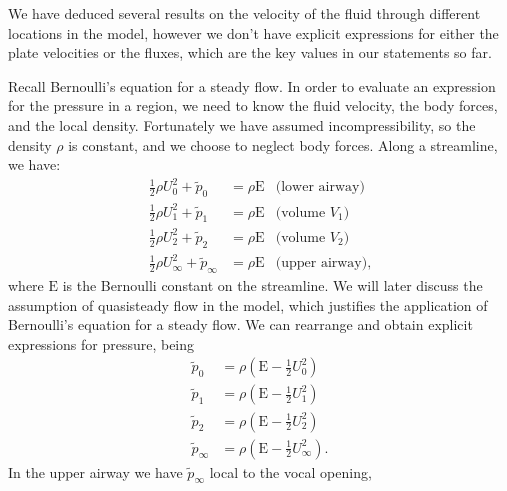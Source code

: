 \documentclass{report}
\begin{document}

We have deduced several results on the velocity of the fluid through different locations in the model,
however we don't have explicit expressions for either the plate velocities or the fluxes,
which are the key values in our statements so far.

Recall Bernoulli's equation for a steady flow.
In order to evaluate an expression for the pressure in a region,
we need to know the fluid velocity, the body forces, and the local density.
Fortunately we have assumed incompressibility, so the density $\rho$ is constant,
and we choose to neglect body forces.
Along a streamline, we have:
\begin{equation}
    \begin{aligned}
        \frac{1}{2}\rho U_0^2 + \tilde{p}_0 &= \rho\mathrm{E} &\text{(lower airway)}\\
        \frac{1}{2}\rho U_1^2 + \tilde{p}_1 &= \rho\mathrm{E} &\text{(volume $V_1$)}  \\
        \frac{1}{2}\rho U_2^2 + \tilde{p}_2 &= \rho\mathrm{E} &\text{(volume $V_2$)}  \\
        \frac{1}{2}\rho U_\infty^2 + \tilde{p}_\infty &= \rho\mathrm{E} &\text{(upper airway)},
    \end{aligned}
\end{equation}
where $\mathrm{E}$ is the Bernoulli constant on the streamline.
We will later discuss the assumption of quasisteady flow in the model,
which justifies the application of Bernoulli's equation for a steady flow.
We can rearrange and obtain explicit expressions for pressure, being
\begin{equation}
    \begin{aligned}
        \tilde{p}_0 &= \rho\left(\mathrm{E} - \frac{1}{2}U_0^2\right) \\
        \tilde{p}_1 &= \rho\left(\mathrm{E} - \frac{1}{2}U_1^2\right) \\
        \tilde{p}_2 &= \rho\left(\mathrm{E} - \frac{1}{2}U_2^2\right) \\
        \tilde{p}_\infty &= \rho\left(\mathrm{E} - \frac{1}{2}U_\infty^2\right).
    \end{aligned}
\end{equation}
In the upper airway we have $\tilde{p}_\infty$ local to the vocal opening,
\end{document}
